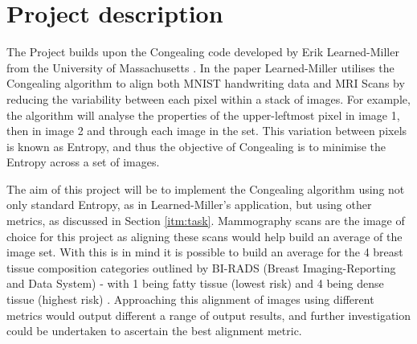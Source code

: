 \documentclass[11pt,fleqn,twoside]{article}
\begin{document}
\wordcount{}

\mmp

\setcounter{tocdepth}{3} %


\section{Project description}

The Project builds upon the Congealing code developed by Erik Learned-Miller from the University of Massachusetts \cite{joint-alignment}. In the paper Learned-Miller utilises the Congealing algorithm to align both MNIST handwriting data and MRI Scans by reducing the variability between each pixel within a stack of images. For example, the algorithm will analyse the properties of the upper-leftmost pixel in image 1, then in image 2 and through each image in the set. This variation between pixels is known as Entropy, and thus the objective of Congealing is to minimise the Entropy across a set of images. \par

The aim of this project will be to implement the Congealing algorithm using not only standard Entropy, as in Learned-Miller's application, but using other metrics, as discussed in Section \ref{itm:task}. Mammography scans are the image of choice for this project as aligning these scans would help build an average of the image set. With this is in mind it is possible to build an average for the 4 breast tissue composition categories outlined by BI-RADS (Breast Imaging-Reporting and Data System) - with 1 being fatty tissue (lowest risk) and 4 being dense tissue (highest risk) \cite{bi-rads}. Approaching this alignment of images using different metrics would output different a range of output results, and further investigation could be undertaken to ascertain the best alignment metric. \par
\end{document}
